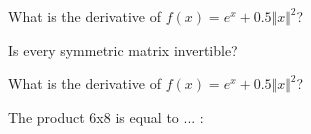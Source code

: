\documentclass{amsart}
\begin{document}
\begin{category}
\begin{question}[essay]
What is the derivative of $f(x) = e^x + 0.5 \Vert x \Vert^2$?
\end{question}

\begin{question}[multichoice]
Is every symmetric matrix invertible?
\end{question}
\begin{question}[essay]
What is the derivative of $f(x) = e^x + 0.5 \Vert x \Vert^2$?
\end{question}
\begin{category}
\begin{question}[multichoice]
The product 6x8 is equal to ... :


\end{question}
\end{category}
\end{category}
\end{document}
